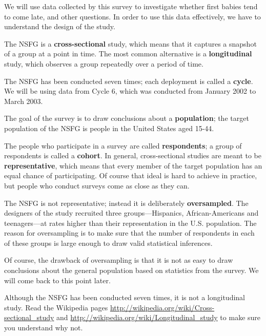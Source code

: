 \documentclass[12pt]{book}
\begin{document}
We will use data collected by this survey to investigate whether first
babies tend to come late, and other questions.  In order to use this
data effectively, we have to understand the design of the study.

The NSFG is a {\bf cross-sectional} study, which means that it
captures a snapshot of a group at a point in time.  The most
common alternative is a {\bf longitudinal} study, which observes a
group repeatedly over a period of time.

The NSFG has been conducted seven times; each deployment is called
a {\bf cycle}.  We will be using data from Cycle 6, which was
conducted from January 2002 to March 2003.

The goal of the survey is to draw conclusions about a
{\bf population}; the target population of the NSFG is people in
the United States aged 15-44.

The people who participate in a survey are called {\bf respondents};
a group of respondents is called a {\bf cohort}.
In general, cross-sectional studies are meant to be {\bf
  representative}, which means that every member of the target
population has an equal chance of participating.  Of course that ideal
is hard to achieve in practice, but people who conduct surveys come as
close as they can.

The NSFG is not representative; instead it is deliberately {\bf
  oversampled}.  The designers of the study recruited three
groups---Hispanics, African-Americans and teenagers---at rates higher
than their representation in the U.S. population.
The reason for oversampling is to make sure that the number of
respondents in each of these groups is large enough to draw valid
statistical inferences.

Of course, the drawback of oversampling is that it is not as easy
to draw conclusions about the general population based on statistics
from the survey.  We will come back to this point later.

\begin{exercise}
Although the NSFG has been conducted seven times, it is not a
longitudinal study.  Read the Wikipedia pages
\url{http://wikipedia.org/wiki/Cross-sectional_study}
and
\url{http://wikipedia.org/wiki/Longitudinal_study}
to make sure you understand why not.

\end{exercise}
\end{document}

